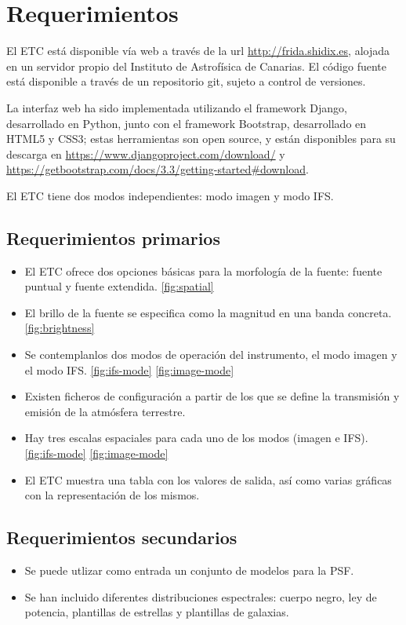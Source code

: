 \section{Requerimientos}
El ETC est\'a disponible v\'ia web a trav\'es de la url \url{http://frida.shidix.es}, alojada en un servidor propio del Instituto de Astrof\'isica de Canarias. El código fuente está disponible a través de un repositorio git, sujeto a control de versiones.  

La interfaz web ha sido implementada utilizando el framework Django, desarrollado en Python, junto con el framework Bootstrap, desarrollado en HTML5 y CSS3; estas herramientas son open source, y están disponibles para su descarga en \url{https://www.djangoproject.com/download/} y \url{https://getbootstrap.com/docs/3.3/getting-started#download}.

El ETC tiene dos modos independientes: modo imagen y modo IFS.

\subsection{Requerimientos primarios}
\begin{itemize}
    \item El ETC ofrece dos opciones b\'asicas para la morfolog\'ia de la fuente: fuente puntual y fuente extendida. \ref{fig:spatial}
    \item El brillo de la fuente se especifica como la magnitud en una banda concreta. \ref{fig:brightness}
    \item Se contemplanlos dos modos de operaci\'on del instrumento, el modo imagen y el modo IFS. \ref{fig:ifs-mode}  \ref{fig:image-mode}
    \item Existen ficheros de configuraci\'on a partir de los que se define la transmisi\'on y emisi\'on de la atm\'osfera terrestre.
    \item Hay tres escalas espaciales para cada uno de los modos (imagen e IFS). \ref{fig:ifs-mode}  \ref{fig:image-mode}
    \item El ETC muestra una tabla con los valores de salida, as\'i como varias gr\'aficas con la representaci\'on de los mismos.

\end{itemize}

\subsection{Requerimientos secundarios}
\begin{itemize}
    \item Se puede utlizar como entrada un conjunto de modelos para la PSF.
    \item Se han incluido diferentes distribuciones espectrales: cuerpo negro, ley de potencia, plantillas de estrellas y plantillas de galaxias.
\end{itemize}

